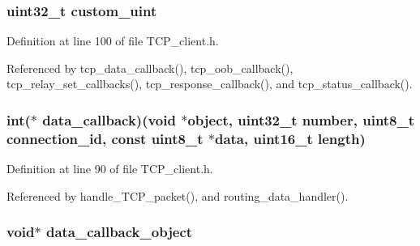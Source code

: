 \hypertarget{struct_t_c_p___client___connection_a1f84a5213a1e59db55448dd696113bfc}{
\subsubsection[{custom\+\_\+uint}]{\setlength{\rightskip}{0pt plus 5cm}uint32\+\_\+t custom\+\_\+uint}}\label{struct_t_c_p___client___connection_a1f84a5213a1e59db55448dd696113bfc}


Definition at line 100 of file T\+C\+P\+\_\+client.\+h.



Referenced by tcp\+\_\+data\+\_\+callback(), tcp\+\_\+oob\+\_\+callback(), tcp\+\_\+relay\+\_\+set\+\_\+callbacks(), tcp\+\_\+response\+\_\+callback(), and tcp\+\_\+status\+\_\+callback().

\hypertarget{struct_t_c_p___client___connection_a2da80454e9a05921b2c6616ffb021eec}{
\subsubsection[{data\+\_\+callback}]{\setlength{\rightskip}{0pt plus 5cm}int($\ast$ data\+\_\+callback)(void $\ast$object, uint32\+\_\+t {\bf number}, uint8\+\_\+t connection\+\_\+id, const uint8\+\_\+t $\ast$data, uint16\+\_\+t length)}}\label{struct_t_c_p___client___connection_a2da80454e9a05921b2c6616ffb021eec}


Definition at line 90 of file T\+C\+P\+\_\+client.\+h.



Referenced by handle\+\_\+\+T\+C\+P\+\_\+packet(), and routing\+\_\+data\+\_\+handler().

\hypertarget{struct_t_c_p___client___connection_a9135a1782241a1b2d5e9bcedef0c29a5}{
\subsubsection[{data\+\_\+callback\+\_\+object}]{\setlength{\rightskip}{0pt plus 5cm}void$\ast$ data\+\_\+callback\+\_\+object}}\label{struct_t_c_p___client___connection_a9135a1782241a1b2d5e9bcedef0c29a5}


